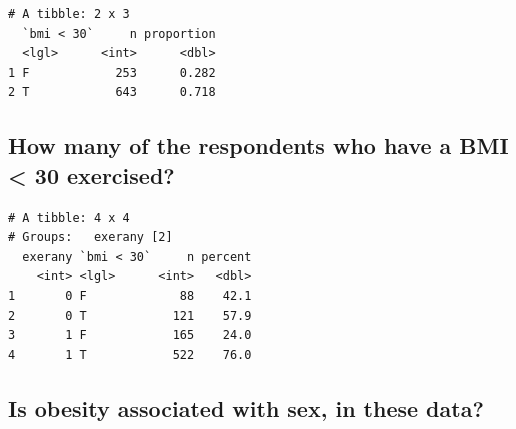 \documentclass[]{book}
\newenvironment{Shaded}{\begin{snugshade}}{\end{snugshade}}
\newcommand{\KeywordTok}[1]{\textcolor[rgb]{0.13,0.29,0.53}{\textbf{#1}}}
\newcommand{\DataTypeTok}[1]{\textcolor[rgb]{0.13,0.29,0.53}{#1}}
\newcommand{\DecValTok}[1]{\textcolor[rgb]{0.00,0.00,0.81}{#1}}
\newcommand{\StringTok}[1]{\textcolor[rgb]{0.31,0.60,0.02}{#1}}
\newcommand{\OperatorTok}[1]{\textcolor[rgb]{0.81,0.36,0.00}{\textbf{#1}}}
\newcommand{\NormalTok}[1]{#1}
\theoremstyle{definition}
\theoremstyle{definition}
\theoremstyle{definition}
\theoremstyle{remark}
\begin{document}
\begin{Shaded}
\end{Shaded}

\begin{verbatim}
# A tibble: 2 x 3
  `bmi < 30`     n proportion
  <lgl>      <int>      <dbl>
1 F            253      0.282
2 T            643      0.718
\end{verbatim}

\subsection{How many of the respondents who have a BMI \textless{} 30
exercised?}\label{how-many-of-the-respondents-who-have-a-bmi-30-exercised}

\begin{Shaded}
\end{Shaded}

\begin{verbatim}
# A tibble: 4 x 4
# Groups:   exerany [2]
  exerany `bmi < 30`     n percent
    <int> <lgl>      <int>   <dbl>
1       0 F             88    42.1
2       0 T            121    57.9
3       1 F            165    24.0
4       1 T            522    76.0
\end{verbatim}

\subsection{Is obesity associated with sex, in these
data?}\label{is-obesity-associated-with-sex-in-these-data}
\end{document}
